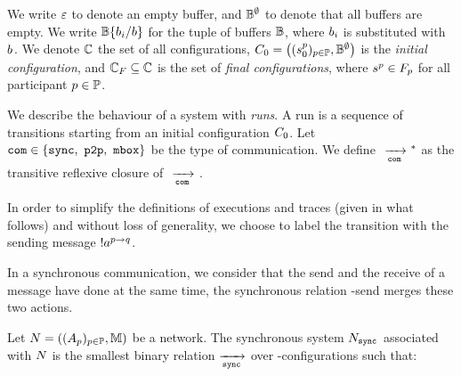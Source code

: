 \documentclass[submission,copyright,creativecommons,UKenglish]{eptcs}
\begin{document}
We write $\emptyword$ to denote an empty buffer, and $\bufferSet^\emptyset$ to denote that all buffers are empty. We write  $\bufferSet\{b_i/b\}$ for the tuple of buffers $\bufferSet$, where  $\buffer{i}$ is substituted with $\buffer{}$.
We denote $\configSet$ the set of all configurations, 
$\configInit= \left((\state{s}{0}{p})_{p\in \Part}, \buffersInit \right)$ is the \emph{initial configuration}, and $\configFinal \subseteq \configSet$ is the set of \emph{final configurations}, where $\state{s}{}{p} \in \finalStates{p}$ for all participant $p \in \Part$.





We describe the behaviour of a system with \emph{runs}. A run is a sequence of transitions starting from an initial configuration $\configInit$.  
Let $\com \in \{\synch,~\pp,~\mailbox\}$ be the type of communication.
We define $\TransitionAsync{}{}{}{\com}{}^*$ as the transitive reflexive closure of $\TransitionAsync{}{}{}{\com}{}$. 

In order to simplify the definitions of executions and traces (given in what follows) and without loss of generality, we choose to label the transition with the sending message $\send{a}{p}{q}$. 

In a synchronous communication, we consider that the send and the receive of a message have done at the same time, \ie the synchronous relation \synch-send merges these two actions. 


\begin{definition}\label{def:synchronousSystem}
 Let $\Network = \left((\Automaton{p})_{p\in \Part}, \messageSet\right)$ be a network. The synchronous system $\System{\Network}{\synch}{}$ associated with $\Network$ is the smallest binary relation $\xrightarrow[\synch]{}$ over \synch-configurations such that:
\begin{prooftree}\label{rule:0-send}
\end{prooftree}

\end{definition}
\end{document}
